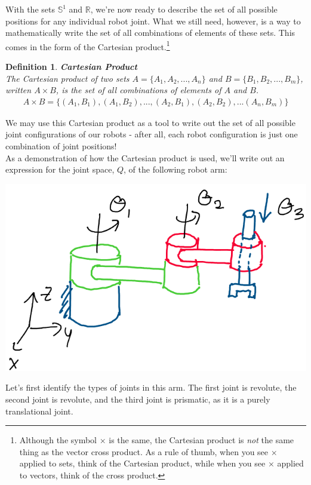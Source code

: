 \documentclass[oneside]{book}
\newtheorem{definition}{Definition}
\newenvironment{defn} %
  {\colorlet{shadecolor}{orange!15}\begin{shaded}\begin{definition}}
  {\end{definition}\end{shaded}}
\begin{document}
With the sets $\mathbb{S}^1$ and $\mathbb{R}$, we're now ready to describe the set of all possible positions for any individual robot joint. What we still need, however, is a way to mathematically write the set of all combinations of elements of these sets. This comes in the form of the Cartesian product.\footnote{Although the symbol $\times$ is the same, the Cartesian product is \textit{not} the same thing as the vector cross product. As a rule of thumb, when you see $\times$ applied to sets, think of the Cartesian product, while when you see $\times$ applied to vectors, think of the cross product.}
\begin{defn}
\textbf{Cartesian Product}\\
The Cartesian product of two sets $A = \{A_1, A_2, ..., A_n\}$ and $B = \{B_1, B_2, ..., B_m\}$, written $A\times B$, is the set of all combinations of elements of $A$ and $B$.
\begin{align}
    A\times B = \{(A_1, B_1), (A_1, B_2), ..., (A_2, B_1), (A_2, B_2), ... (A_n, B_m)\}
\end{align}
\end{defn}
\noindent
We may use this Cartesian product as a tool to write out the set of all possible joint configurations of our robots - after all, each robot configuration is just one combination of joint positions!\\
As a demonstration of how the Cartesian product is used, we'll write out an expression for the joint space, $Q$, of the following robot arm:
\begin{center}
\includegraphics[scale=0.3]{images/JointSpaceArm.png}
\end{center}
Let's first identify the types of joints in this arm. The first joint is revolute, the second joint is revolute, and the third joint is prismatic, as it is a purely translational joint.\\
\end{document}
